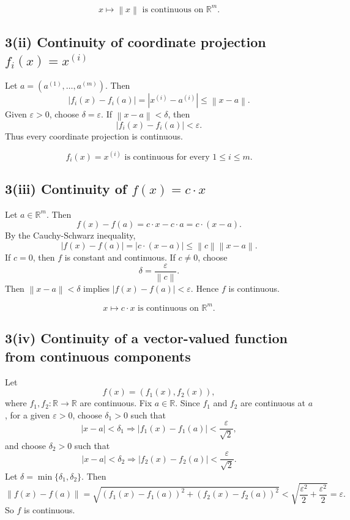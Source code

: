 \documentclass[11pt]{article}
\newcommand{\R}{\mathbb{R}}
\newcommand{\norm}[1]{\left\lVert #1 \right\rVert}
\newcommand{\abs}[1]{\left\lvert #1 \right\rvert}
\begin{document}
\begin{answerbox}
\[
\boxed{x\mapsto\norm{x}\text{ is continuous on }\R^m.}
\]
\end{answerbox}

\subsection{3(ii) Continuity of coordinate projection \(f_i(x)=x^{(i)}\)}

Let \(a=(a^{(1)},\dots,a^{(m)})\). Then
\[
\abs{f_i(x)-f_i(a)}=\abs{x^{(i)}-a^{(i)}}\leq\norm{x-a}.
\]
Given \(\varepsilon>0\), choose \(\delta=\varepsilon\). If \(\norm{x-a}<\delta\), then
\[
\abs{f_i(x)-f_i(a)}<\varepsilon.
\]
Thus every coordinate projection is continuous.

\begin{answerbox}
\[
\boxed{f_i(x)=x^{(i)}\text{ is continuous for every }1\leq i\leq m.}
\]
\end{answerbox}

\subsection{3(iii) Continuity of \(f(x)=c\cdot x\)}

Let \(a\in\R^m\). Then
\[
f(x)-f(a)=c\cdot x-c\cdot a=c\cdot(x-a).
\]
By the Cauchy-Schwarz inequality,
\[
\abs{f(x)-f(a)}=\abs{c\cdot(x-a)}\leq \norm{c}\norm{x-a}.
\]
If \(c=0\), then \(f\) is constant and continuous. If \(c\neq0\), choose
\[
\delta=\frac{\varepsilon}{\norm{c}}.
\]
Then \(\norm{x-a}<\delta\) implies \(\abs{f(x)-f(a)}<\varepsilon\). Hence \(f\) is continuous.

\begin{answerbox}
\[
\boxed{x\mapsto c\cdot x\text{ is continuous on }\R^m.}
\]
\end{answerbox}

\subsection{3(iv) Continuity of a vector-valued function from continuous components}

Let
\[
f(x)=(f_1(x),f_2(x)),
\]
where \(f_1,f_2:\R\to\R\) are continuous. Fix \(a\in\R\). Since \(f_1\) and \(f_2\) are continuous at \(a\), for a given \(\varepsilon>0\), choose \(\delta_1>0\) such that
\[
|x-a|<\delta_1\Rightarrow |f_1(x)-f_1(a)|<\frac{\varepsilon}{\sqrt2},
\]
and choose \(\delta_2>0\) such that
\[
|x-a|<\delta_2\Rightarrow |f_2(x)-f_2(a)|<\frac{\varepsilon}{\sqrt2}.
\]
Let \(\delta=\min\{\delta_1,\delta_2\}\). Then
\[
\norm{f(x)-f(a)}
=\sqrt{(f_1(x)-f_1(a))^2+(f_2(x)-f_2(a))^2}
<\sqrt{\frac{\varepsilon^2}{2}+\frac{\varepsilon^2}{2}}
=\varepsilon.
\]
So \(f\) is continuous.
\end{document}
